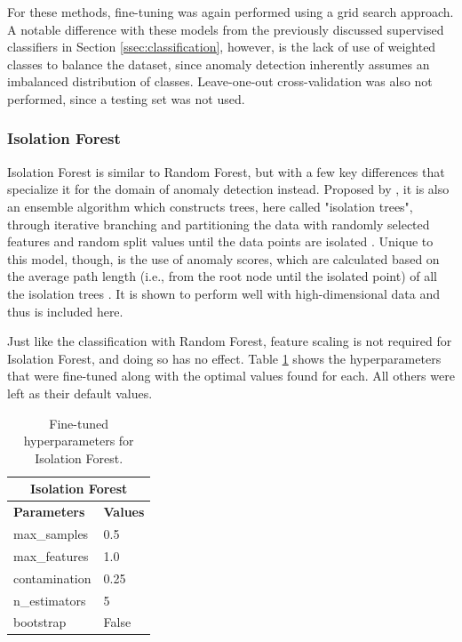 \documentclass[12pt,a4paper]{article}
\numberwithin{figure}{section}
\numberwithin{table}{section}
\numberwithin{definition}{section}
\begin{document}
For these methods, fine-tuning was again performed using a grid search approach. A notable difference with these models from the previously discussed supervised classifiers in Section \ref{ssec:classification}, however, is the lack of use of weighted classes to balance the dataset, since anomaly detection inherently assumes an imbalanced distribution of classes. Leave-one-out cross-validation was also not performed, since a testing set was not used.

\subsubsection{Isolation Forest}
\label{ssec:isolationforest}

Isolation Forest is similar to Random Forest, but with a few key differences that specialize it for the domain of anomaly detection instead. Proposed by \textcite{Liu2009inproceedings}, it is also an ensemble algorithm which constructs trees, here called "isolation trees", through iterative branching and partitioning the data with randomly selected features and random split values until the data points are isolated \parencite{Xu2023article}. Unique to this model, though, is the use of anomaly scores, which are calculated based on the average path length (i.e., from the root node until the isolated point) of all the isolation trees \parencite{Rosenhahn2024article}. It is shown to perform well with high-dimensional data \parencite{Naser2024article} and thus is included here. 

Just like the classification with Random Forest, feature scaling is not required for Isolation Forest, and doing so has no effect. Table \ref{tbl:isolationforestparams} shows the hyperparameters that were fine-tuned along with the optimal values found for each. All others were left as their default values.

\begin{table}[!h] 
  \centering\small
  \renewcommand{\arraystretch}{1.5} 
  \begin{tabular}{@{}ll@{}}
  \hline
  \multicolumn{2}{|c|}{\textbf{Isolation Forest}} \\
  \hline
  \textbf{Parameters} & \textbf{Values} \\
  \hline
  max\_samples & 0.5 \\
  max\_features & 1.0 \\
  contamination & 0.25 \\
  n\_estimators & 5 \\
  bootstrap & False \\
  \hline
  \end{tabular}
  \caption{Fine-tuned hyperparameters for Isolation Forest.}
  \label{tbl:isolationforestparams}
\end{table}
\end{document}
